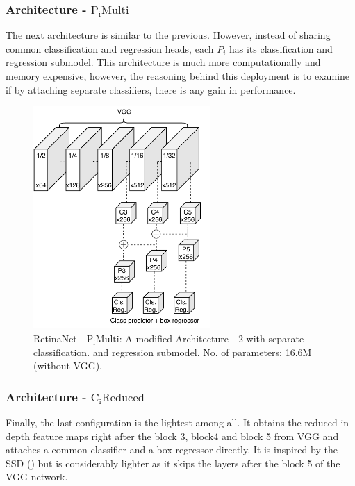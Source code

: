\subsubsection{Architecture - $\text{P}_\text{i}\text{Multi}$}\label{arch_3}
The next architecture is similar to the previous. However, instead of sharing common classification and regression heads, each $P_i$ has its classification and regression submodel. This architecture is much more computationally and memory expensive, however, the reasoning behind this deployment is to examine if by attaching separate classifiers, there is any gain in performance.

\begin{figure}[!htb]
  \centering
  \includegraphics[width=0.6\textwidth]{figures/ch3/fig5.pdf}
  \caption{RetinaNet - $\text{P}_\text{i}\text{Multi}$: A modified Architecture - 2 with separate classification. and regression submodel. No. of parameters: 16.6M (without VGG).}
  \label{fig5}
\end{figure} 

\subsubsection{Architecture - $\text{C}_\text{i}\text{Reduced}$} 
Finally, the last configuration is the lightest among all. It obtains the reduced in depth feature maps right after the block 3, block4 and block 5 from VGG and attaches a common classifier and a box regressor directly. It is inspired by the SSD (\cite{liu2016ssd}) but is considerably lighter as it skips the layers after the block 5 of the VGG network.

